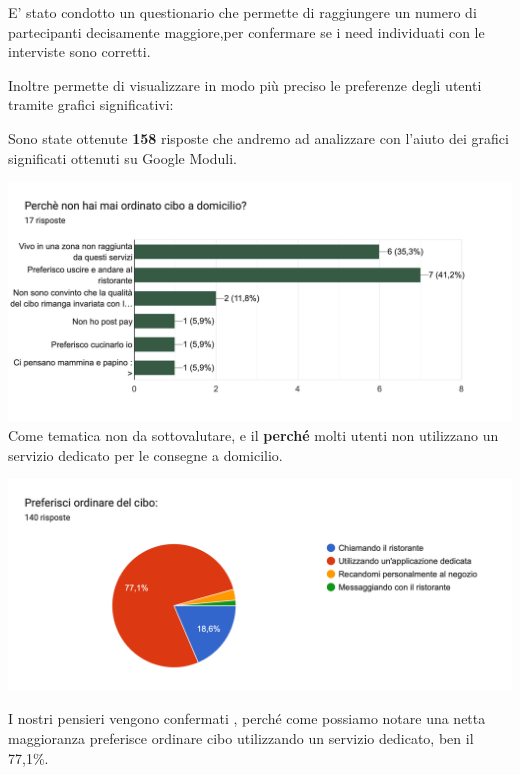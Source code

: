 \documentclass{article}
\begin{document}
    \vspace{1cm} \par 
\par E' stato condotto un questionario che permette di raggiungere un numero di partecipanti decisamente maggiore,per confermare se i need individuati con le interviste sono corretti.\par Inoltre permette di visualizzare in modo più preciso le preferenze degli utenti tramite grafici significativi:
\par \vspace{1cm}
Sono state ottenute \textbf{158} risposte che andremo ad analizzare con l'aiuto dei grafici significati ottenuti su Google Moduli.
\par 
\includegraphics[width=\textwidth]{Data/Grafici/Perche_non_ordina.png}
Come tematica non da sottovalutare, e il \textbf{perché} molti utenti non utilizzano un servizio dedicato per le consegne a domicilio.\vspace{1cm}\par
\includegraphics[width=\textwidth]{Data/Grafici/ordinare_cibo.png}\par
I nostri pensieri vengono confermati , perché come possiamo notare una netta maggioranza preferisce ordinare cibo utilizzando un servizio dedicato, ben il 77,1\%.\par \vspace{1cm}
\end{document}
